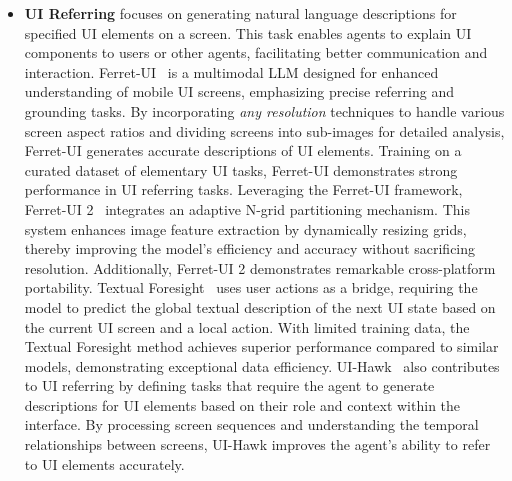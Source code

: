 \begin{itemize}
\item \textbf{UI Referring}
focuses on generating natural language descriptions for specified UI elements on a screen. This task enables agents to explain UI components to users or other agents, facilitating better communication and interaction.
Ferret-UI~\cite{you2024ferret} is a multimodal LLM designed for enhanced understanding of mobile UI screens, emphasizing precise referring and grounding tasks. By incorporating \textit{any resolution} techniques to handle various screen aspect ratios and dividing screens into sub-images for detailed analysis, Ferret-UI generates accurate descriptions of UI elements. Training on a curated dataset of elementary UI tasks, Ferret-UI demonstrates strong performance in UI referring tasks.
Leveraging the Ferret-UI framework, Ferret-UI 2~\cite{li2024ferretui2masteringuniversal} integrates an adaptive N-grid partitioning mechanism. This system enhances image feature extraction by dynamically resizing grids, thereby improving the model's efficiency and accuracy without sacrificing resolution. Additionally, Ferret-UI 2 demonstrates remarkable cross-platform portability. Textual Foresight~\cite{burns2024tell} uses user actions as a bridge, requiring the model to predict the global textual description of the next UI state based on the current UI screen and a local action. With limited training data, the Textual Foresight method achieves superior performance compared to similar models, demonstrating exceptional data efficiency.
UI-Hawk~\cite{zhang2024ui-hawk} also contributes to UI referring by defining tasks that require the agent to generate descriptions for UI elements based on their role and context within the interface. By processing screen sequences and understanding the temporal relationships between screens, UI-Hawk improves the agent's ability to refer to UI elements accurately.


\end{itemize}
